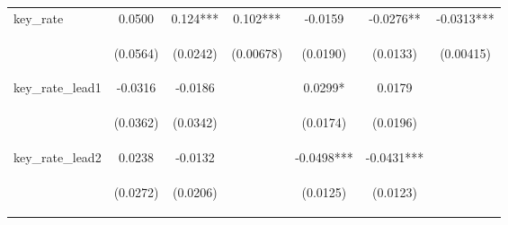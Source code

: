 \documentclass[]{article}
\begin{document}
\begin{center}
\begin{tabular}{lcccccc}
key\_rate & 0.0500 & 0.124*** & 0.102*** & -0.0159 & -0.0276** & -0.0313*** \\
\vspace{4pt} & \begin{footnotesize}(0.0564)\end{footnotesize} & \begin{footnotesize}(0.0242)\end{footnotesize} & \begin{footnotesize}(0.00678)\end{footnotesize} & \begin{footnotesize}(0.0190)\end{footnotesize} & \begin{footnotesize}(0.0133)\end{footnotesize} & \begin{footnotesize}(0.00415)\end{footnotesize} \\
key\_rate\_lead1 & -0.0316 & -0.0186 &  & 0.0299* & 0.0179 &  \\
\vspace{4pt} & \begin{footnotesize}(0.0362)\end{footnotesize} & \begin{footnotesize}(0.0342)\end{footnotesize} & \begin{footnotesize}\end{footnotesize} & \begin{footnotesize}(0.0174)\end{footnotesize} & \begin{footnotesize}(0.0196)\end{footnotesize} & \begin{footnotesize}\end{footnotesize} \\
key\_rate\_lead2 & 0.0238 & -0.0132 &  & -0.0498*** & -0.0431*** &  \\
\vspace{4pt} & \begin{footnotesize}(0.0272)\end{footnotesize} & \begin{footnotesize}(0.0206)\end{footnotesize} & \begin{footnotesize}\end{footnotesize} & \begin{footnotesize}(0.0125)\end{footnotesize} & \begin{footnotesize}(0.0123)\end{footnotesize} & \begin{footnotesize}\end{footnotesize} \\

\end{tabular}
\end{center}
\end{document}
